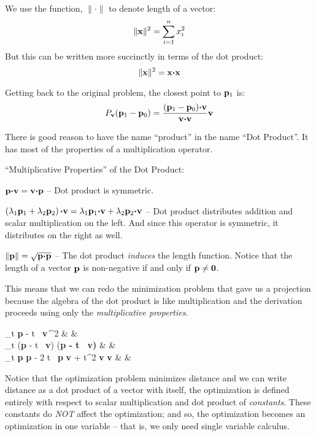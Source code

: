 \documentclass[12pt]{article}
\begin{document}
{We use the function, $\| \cdot \|$ to denote length of a vector:
$$ \|{\bf x}\|^2 = \sum_{i=1}^n x_i^2$$
But this can be written more succinctly in terms of the dot product: 
$$ \|{\bf x}\|^2 = {\bf x} {\boldsymbol \cdot} {\bf x} $$


Getting back to the original problem, the closest point to ${\bf p}_1$ is:
$$ P_{\bf v}({\bf p}_1 - {\bf p}_0) = \frac{({\bf p}_1 - {\bf p}_0) 
    {\boldsymbol \cdot}{\bf v}}{{\bf v} {\boldsymbol \cdot} {\bf v}} {\bf v}$$

There is good reason to have the name ``product'' in the name ``Dot Product''. 
It has most of the properties of a multiplication operator.

``Multiplicative Properties'' of the Dot Product:
\bi
  \item{${\bf p} {\boldsymbol \cdot} {\bf v} = {\bf v} 
      {\boldsymbol \cdot} {\bf p} $ -- Dot product is symmetric.}
  \item{$\left(\lambda_1 {\bf p}_1 + \lambda_2 {\bf p}_2\right) 
      {\boldsymbol \cdot} {\bf v} = \lambda_1 {\bf p}_1 {\boldsymbol \cdot} {\bf v} + 
      \lambda_2 {\bf p}_2 {\boldsymbol \cdot} {\bf v} $ 
    -- Dot product distributes addition and scalar multiplication on the left. 
    And since this operator is symmetric, it distributes on the right as well.}
  \item{$\|{\bf p}\| = \sqrt{{\bf p} {\boldsymbol \cdot} {\bf p}}$ -- 
    The dot product {\em induces\/} the length function. 
    Notice that the length of a vector ${\bf p}$ is non-negative if and only 
    if ${\bf p} \neq {\bf 0}$.}
\ei

This means that we can redo the minimization problem that gave us a 
projection because the algebra of the dot product is like multiplication 
and the derivation proceeds using only the {\em multiplicative properties\/}.

\be
  _t \| {\bf p} - t \, {\bf v} \|^2 & & \nonumber \\
  _t ({\bf p} - t \, {\bf v}) {\boldsymbol \cdot} ({\bf p - t \, {\bf v})} & & \nonumber \\
  _t {\bf p} {\boldsymbol \cdot}  {\bf p} - 2 t \, {\bf p} {\boldsymbol \cdot} {\bf v} + t^2 {\bf v} {\boldsymbol \cdot} {\bf v} & & 
\ee

Notice that the optimization problem minimizes distance and we can write 
distance as a dot product of a vector with itself, the optimization
is defined entirely with respect to scalar multiplication and dot product of {\em constants\/}.
These constants do {\em NOT\/} affect the optimization; and so, the optimization 
becomes an optimization in one variable -- that is, we only need single variable calculus.

}
\end{document}

